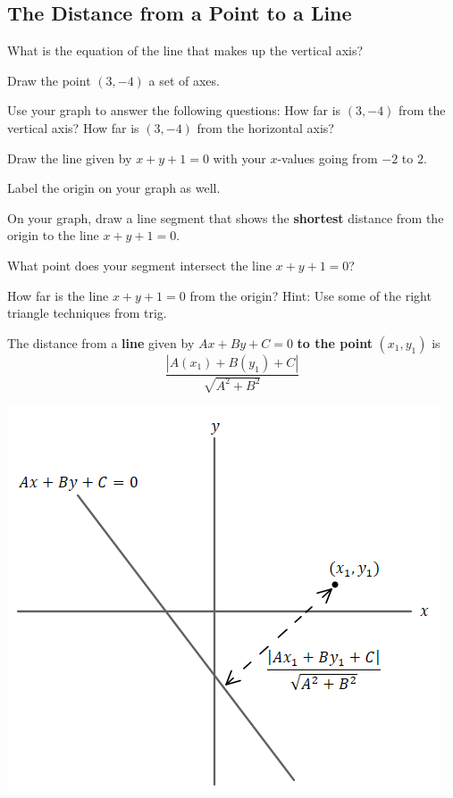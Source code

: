 \subsection{The Distance from a Point to a Line}
\bq
\be
\item What is the equation of the line that makes up the vertical axis?
\item Draw the point $(3,-4)$ a set of axes.
\item Use your graph to answer the following questions:
\subitem How far is $(3,-4)$ from the vertical axis?
\subitem How far is $(3,-4)$ from the horizontal axis?
\ee
\eq

\bq
\be
\item Draw the line given by $x+y+1=0$ with your $x$-values going from $-2$ to $2$.
\item Label the origin on your graph as well.
\item On your graph, draw a line segment that shows the \textbf{shortest} distance from the origin to the line $x+y+1=0$.
\item What point does your segment intersect the line $x+y+1=0$?
\item How far is the line $x+y+1=0$ from the origin? Hint: Use some of the right triangle techniques from trig.
\ee
\eq

\begin{info}
The distance from a \textbf{line} given by $Ax+By+C=0$ \textbf{to the point} $(x_1,y_1)$ is $$\frac{|A(x_1)+B(y_1)+C|}{\sqrt{A^2+B^2}}$$

\begin{center} \includegraphics[scale=.75]{pldist.png} \end{center}
\end{info}

